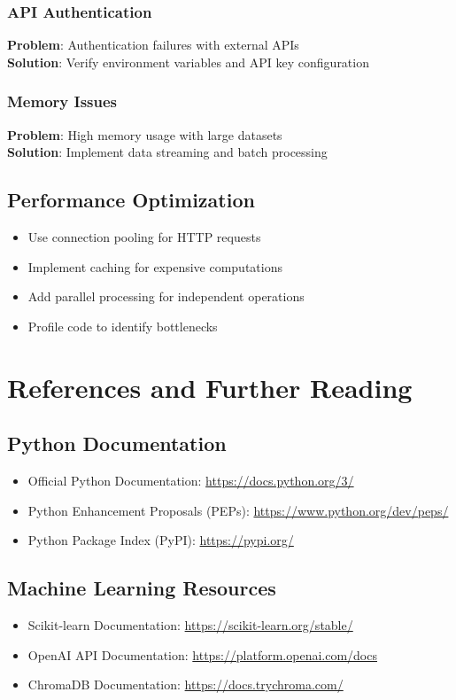 \documentclass[12pt,twoside,openright]{book}
\begin{document}
\subsection{API Authentication}
\textbf{Problem}: Authentication failures with external APIs\\
\textbf{Solution}: Verify environment variables and API key configuration

\subsection{Memory Issues}
\textbf{Problem}: High memory usage with large datasets\\
\textbf{Solution}: Implement data streaming and batch processing

\section{Performance Optimization}

\begin{itemize}
    \item Use connection pooling for HTTP requests
    \item Implement caching for expensive computations
    \item Add parallel processing for independent operations
    \item Profile code to identify bottlenecks
\end{itemize}

\backmatter

\chapter{References and Further Reading}

\section{Python Documentation}
\begin{itemize}
    \item Official Python Documentation: \url{https://docs.python.org/3/}
    \item Python Enhancement Proposals (PEPs): \url{https://www.python.org/dev/peps/}
    \item Python Package Index (PyPI): \url{https://pypi.org/}
\end{itemize}

\section{Machine Learning Resources}
\begin{itemize}
    \item Scikit-learn Documentation: \url{https://scikit-learn.org/stable/}
    \item OpenAI API Documentation: \url{https://platform.openai.com/docs}
    \item ChromaDB Documentation: \url{https://docs.trychroma.com/}
\end{itemize}
\end{document}
